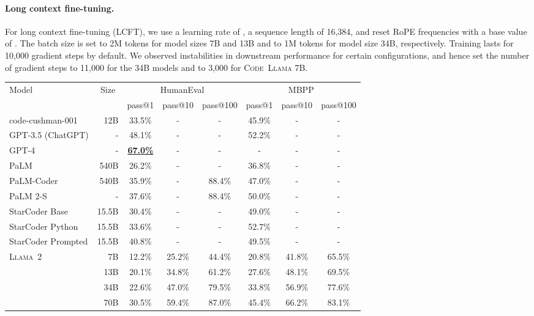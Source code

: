 \documentclass[10pt]{article}
\newcommand{\model}{\textsc{Code~Llama}\xspace}
\newcommand{\llamavtwo}{\textsc{Llama~2}\xspace}
\newcommand*{\acc}[1]{\num[round-mode=places,round-precision=1]{#1}\%}
\begin{document}
\paragraph{Long context fine-tuning.}
For long context fine-tuning (LCFT), we use a learning rate of , a sequence length of 16,384, and reset RoPE frequencies with a base value of .
The batch size is set to 2M tokens for model sizes 7B and 13B and to 1M tokens for model size 34B, respectively.
Training lasts for 10,000 gradient steps by default.
We observed instabilities in downstream performance for certain configurations, and hence set the number of gradient steps to 11,000 for the 34B models and to 3,000 for \model7B.

\begin{table}[t!]
  \center
   \setlength{\tabcolsep}{3pt}
  \begin{tabular}{lr|ccc|ccc} \toprule
  Model &\multicolumn{1}{c}{Size}& \multicolumn{3}{c}{HumanEval} & \multicolumn{3}{c}{MBPP} \\&& pass@1 & pass@10 & pass@100 & pass@1 & pass@10 & pass@100 \\\midrule 
  code-cushman-001 &12B & \acc{33.5} & - & - & \acc{45.9} & - & -\\ 
  GPT-3.5 (ChatGPT) &-& \acc{48.1} & - & - & \acc{52.2} & - & - \\
  GPT-4 &-& \bf{\underline{\acc{67.0}}} & - & - & - & - & - \\
  PaLM &540B& \acc{26.2} & - & - & \acc{36.8} & - & -\\
  PaLM-Coder &540B& \acc{35.9} & - & \acc{88.4} & \acc{47.0} & - & - \\
  PaLM 2-S & - & \acc{37.6} & - & \acc{88.4} & \acc{50.0} & - & - \\ 
  StarCoder Base &15.5B & \acc{30.4} & - & - & \acc{49.0} & - & - \\
  StarCoder Python &15.5B & \acc{33.6} & - & - & \acc{52.7} & - & - \\
  StarCoder Prompted & 15.5B & \acc{40.8} & - & - & \acc{49.5} & - & - \\
  \midrule
  \multirow{ 4}{*}{\llamavtwo} 
  & 7B  & \acc{12.2}  & \acc{25.2}& \acc{44.4} & \acc{20.8} &\acc{41.8} & \acc{65.5}\\
  &13B  & \acc{20.1}  &\acc{34.8} & \acc{61.2} & \acc{27.6}&\acc{48.1}& \acc{69.5}\\
  &34B  & \acc{22.6}  &\acc{47.0} & \acc{79.5} & \acc{33.8}&\acc{56.9}& \acc{77.6}\\
  &70B  &  \acc{30.5} &\acc{59.4} & \acc{87.0} &\acc{45.4} &\acc{66.2}& \acc{83.1}\\

\end{tabular}
\end{table}
\end{document}
